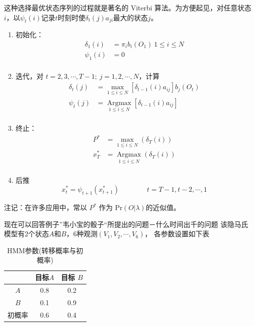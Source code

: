 \begin{enumerate}
这种选择最优状态序列的过程就是著名的 Viterbi 算法。为方便起见，对任意状态
$i$，以$\psi_{t}(i)$记录$t$时刻时使$\delta_{t}(j)a_{ji}$最大的状态$j$。
\end{enumerate}

\vspace*{\baselineskip}
{\it
{}
\begin{enumerate}
  \item   初始化：
 $$
    \begin{aligned}
             \delta_{1}(i)&=\pi_{i}b_{i}(O_{1})\  1\leq i\leq N \\
      \psi_{1}(i)&=0\\
    \end{aligned}
 $$
 \item   迭代，对 $t=2,3,\cdots,T-1;\ j=1,2,\cdots,N$，计算
 $$
    \begin{aligned}
    \delta_{t}(j)&=\max\limits_{1\leq i\leq N}[\delta_{t-1}(i)a_{ij}] b_{j}(O_{t})\\
       \psi_{t}(j)&=\mathop{\mbox{Argmax}}\limits_{1\leq i\leq N}[\delta_{t-1}(i)a_{ij}]\\
    \end{aligned}
 $$
  \item  终止：
 $$
    \begin{aligned}
       P^{\ast}&=\max\limits_{1\leq i\leq N}(\delta_{T}(i))\\
       x_{T}^{\ast}&=\mathop{\mbox{Argmax}}\limits_{1\leq i\leq N}(\delta_{T}(i))\\
    \end{aligned}
$$
\item  后推
 $$
           x_{t}^{\ast}=\psi_{t+1}(x_{t+1}^{\ast}) \qquad\qquad  t=T-1,t-2,\cdots,1
$$
\end{enumerate}
}
注记：在许多应用中，常以 $P^{\ast}$  作为 $\mbox{Pr}(O | \lambda)$的近似值。

现在可以回答例子”韦小宝的骰子“所提出的问题－什么时间出千的问题
该隐马氏模型有2个状态$A$和$B$，$6$种观测$(V_{1},V_{2},\cdots, V_{6})$，
各参数设置如下表
\begin{table}
 \centering
   \begin{tabular}{|c|c|c|}
     \hline
     &目标$A$ & 目标 $B$\\
      \hline
         $A$ & 0.8 & 0.2\\
      \hline
         $B$ & 0.1 & 0.9 \\
      \hline
         初概率 & 0.6 & 0.4\\
      \hline
   \end{tabular}
\caption{HMM参数(转移概率与初概率)}
\end{table}

